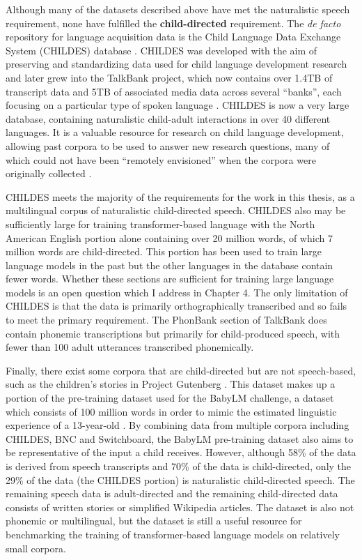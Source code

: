 Although many of the datasets described above have met the naturalistic speech requirement, none have fulfilled the \textbf{child-directed} requirement. The \emph{de facto} repository for language acquisition data is the Child Language Data Exchange System (CHILDES) database \citep{macwhinney1985child}. CHILDES was developed with the aim of preserving and standardizing data used for child language development research and later grew into the TalkBank project, which now contains over 1.4TB of transcript data and 5TB of associated media data across several ``banks'', each focusing on a particular type of spoken language \citep{macwhinney_understanding_2019}. CHILDES is now a very large database, containing naturalistic child-adult interactions in over 40 different languages. It is a valuable resource for research on child language development, allowing past corpora to be used to answer new research questions, many of which could not have been ``remotely envisioned'' when the corpora were originally collected \citep{bernstein_ratner_augmenting_2024}. 

CHILDES meets the majority of the requirements for the work in this thesis, as a multilingual corpus of naturalistic child-directed speech. CHILDES also may be sufficiently large for training transformer-based language with the North American English portion alone containing over 20 million words, of which 7 million words are child-directed. This portion has been used to train large language models in the past \citep{huebner-etal-2021-babyberta} but the other languages in the database contain fewer words. Whether these sections are sufficient for training large language models is an open question which I address in Chapter 4. The only limitation of CHILDES is that the data is primarily orthographically transcribed and so fails to meet the primary requirement. The PhonBank section of TalkBank does contain phonemic transcriptions but primarily for child-produced speech, with fewer than 100 adult utterances transcribed phonemically. 

Finally, there exist some corpora that are child-directed but are not speech-based, such as the children's stories in Project Gutenberg \citep{gerlach2018standardizedprojectgutenbergcorpus}. This dataset makes up a portion of the pre-training dataset used for the BabyLM challenge, a dataset which consists of 100 million words in order to mimic the estimated linguistic experience of a 13-year-old \citep{choshen-et-al-2024-callforpapers-babylm2}. By combining data from multiple corpora including CHILDES, BNC and Switchboard, the BabyLM pre-training dataset also aims to be representative of the input a child receives. However, although 58\% of the data is derived from speech transcripts and 70\% of the data is child-directed, only the 29\% of the data (the CHILDES portion) is naturalistic child-directed speech. The remaining speech data is adult-directed and the remaining child-directed data consists of written stories or simplified Wikipedia articles. The dataset is also not phonemic or multilingual, but the dataset is still a useful resource for benchmarking the training of transformer-based language models on relatively small corpora.

